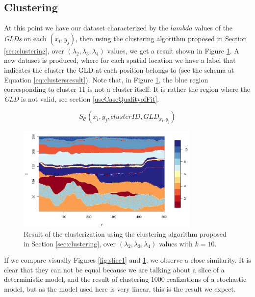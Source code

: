\subsection{Clustering}\label{useCaseClustering}
At this point we have our dataset characterized by the $lambda$ values of the \textit{GLDs} on each $(x_{i},y_{j})$, then using the clustering algorithm proposed in Section \ref{sec:clustering}, over $(\lambda_{2}, \lambda_{3}, \lambda_{4})$ values, we get a result shown in Figure \ref{fig:clusters}. A new dataset is produced, where for each spatial location we have a label that indicates the cluster the GLD at each position belongs to (see the schema at Equation \ref{eq:clustersresult}). Note that, in Figure \ref{fig:clusters}, the blue region corresponding to cluster 11 is not a cluster itself. It is rather the region where the \textit{GLD} is not valid, see section \ref{useCaseQualityofFit}.

\begin{equation}\label{eq:clustersresult}
S_{\mathcal{C}}(x_{i},y_{j},clusterID, GLD_{x_{i},y_{j}})
\end{equation}

\begin{figure}[H]
    \centering
    \includegraphics[width=0.8\textwidth]{images/clusters1.png}
    \caption{Result of the clusterization using the clustering algorithm proposed in Section \ref{sec:clustering}, over $(\lambda_{2}, \lambda_{3}, \lambda_{4})$ values with $k=10$.}
    \label{fig:clusters}
\end{figure}

If we compare visually Figures \ref{fig:slice1} and \ref{fig:clusters}, we observe a close similarity. It is clear that they can not be equal because we are talking about a slice of a deterministic model, and the result of clustering 1000 realizations of a stochastic model, but as the model used here is very linear, this is the result we expect.

